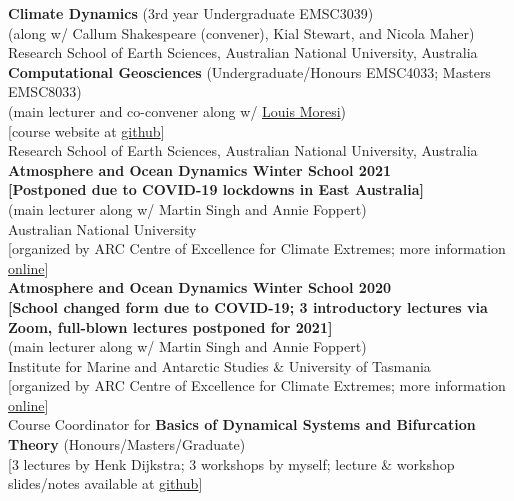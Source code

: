 \documentclass[10pt, letter]{article}
\newcommand{\years}[1]{\marginnote{\scriptsize #1}}
\begin{document}
\noindent\years{2024 -- }\textbf{Climate Dynamics} (3rd year Undergraduate EMSC3039)\\
(along w/ Callum Shakespeare (convener), Kial Stewart, and Nicola Maher)\\
Research School of Earth Sciences, Australian National University, Australia\\[.2cm]
\noindent\years{2021 -- 2023}\textbf{Computational Geosciences} (Undergraduate/Honours EMSC4033; Masters EMSC8033)\\
(main lecturer and co-convener along w/ \href{http://www.moresi.info}{\color{black}Louis Moresi})\\[0pt]
[course website at \href{https://github.com/ANU-RSES-Education/EMSC-4033}{github}]\\
Research School of Earth Sciences, Australian National University, Australia\\[.2cm]
\noindent\years{Jun.~2021}\textbf{Atmosphere and Ocean Dynamics Winter School 2021}\\
\textbf{[Postponed due to COVID-19 lockdowns in East Australia]}\\
(main lecturer along w/ Martin Singh and Annie Foppert)\\[0pt]
Australian National University\\[0pt]
[organized by ARC Centre of Excellence for Climate Extremes; more information \href{https://climateextremes.org.au/winter-school-2021-atmosphere-and-ocean-dynamics/}{online}]\\[.2cm]
\noindent\years{Jun.~2020}\textbf{Atmosphere and Ocean Dynamics Winter School 2020}\\
\textbf{[School changed form due to COVID-19; 3 introductory lectures via Zoom, full-blown lectures postponed for 2021]}\\
(main lecturer along w/ Martin Singh and Annie Foppert)\\[0pt]
Institute for Marine and Antarctic Studies \& University of Tasmania\\[0pt]
[organized by ARC Centre of Excellence for Climate Extremes; more information \href{https://climateextremes.org.au/clex-winter-school-2020-atmosphere-and-ocean-dynamics/}{online}]\\[.2cm]
\noindent\years{2020}Course Coordinator for \textbf{Basics of Dynamical Systems and Bifurcation Theory} (Honours/Masters/Graduate)\\[0pt] [3 lectures by Henk Dijkstra; 3 workshops by myself; lecture \& workshop slides/notes available at \href{https://github.com/ClimateFluidPhysics-ANU/DynamicalSystems-BifurcationTheory}{github}]\\
\end{document}
